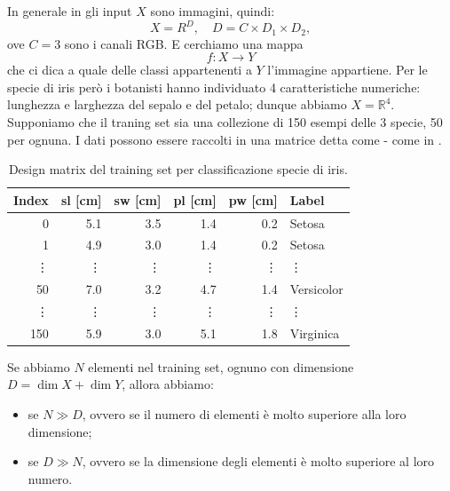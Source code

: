 \documentclass[10pt]{article}
\begin{document}
\begin{example}
In generale in  gli input $X$ sono immagini, quindi:
\begin{equation}
X = R^D,\quad D = C\times D_1\times D_2,
\end{equation}
ove $C = 3$ sono i canali RGB. E cerchiamo una mappa
\begin{equation}
f: X \longrightarrow Y
\end{equation}
che ci dica a quale delle classi appartenenti a $Y$ l'immagine appartiene. Per le specie di iris però i botanisti hanno individuato 4 caratteristiche numeriche: lunghezza e larghezza del sepalo e del petalo; dunque abbiamo $X = \mathbb{R}^4$. Supponiamo che il traning set sia una collezione di 150 esempi delle 3 specie, 50 per ognuna. I dati possono essere raccolti in una matrice detta  come  - come in .

\begin{table}
\centering
\begin{tabular}{rrrrrl}
\toprule
Index & sl [cm] & sw [cm] & pl [cm] & pw [cm] & Label \\
\midrule
0 & 5.1 & 3.5 & 1.4 & 0.2 & Setosa \\
1 & 4.9 & 3.0 & 1.4 & 0.2 & Setosa \\
\vdots & \vdots & \vdots & \vdots & \vdots & \vdots \\
50 & 7.0 & 3.2 & 4.7 & 1.4 & Versicolor \\
\vdots & \vdots & \vdots & \vdots & \vdots & \vdots \\
150 & 5.9 & 3.0 & 5.1 & 1.8 & Virginica \\
\bottomrule
\end{tabular}
\caption{Design matrix del training set per classificazione specie di iris.}\label{tab:iris}
\end{table}

Se abbiamo $N$ elementi nel training set, ognuno con dimensione $D = \dim{X} + \dim{Y}$, allora abbiamo:
\begin{itemize}
\item {} se $N\gg D$, ovvero se il numero di elementi è molto superiore alla loro dimensione;
\item {} se $D\gg N$, ovvero se la dimensione degli elementi è molto superiore al loro numero.
\end{itemize}


\end{example}
\end{document}
